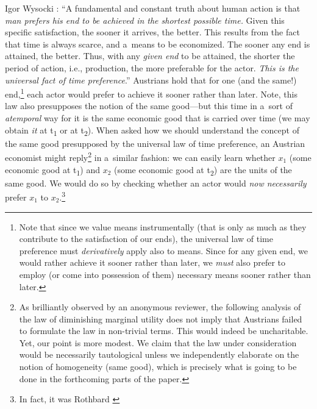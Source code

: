 \begin{artengenv}{Igor Wysocki}
{%
\parencite*[][p.15]{rothbard_toward_2011}: %
 ``A fundamental and constant truth about human action is that \textit{man prefers his end to be achieved in the shortest possible time.} Given this specific satisfaction, the sooner it arrives, the better. This results from the fact that time is always scarce, and a~means to be economized. The sooner any end is attained, the better. Thus, with any \textit{given end} to be attained, the shorter the period of action, i.e., production, the more preferable for the actor. \textit{This is the universal fact of time preference}.''} Austrians hold that for one (and the same!) end,\footnote{Note that since we value means instrumentally (that is only as much as they contribute to the satisfaction of our ends), the universal law of time preference must \textit{derivatively} apply also to means. Since for any given end, we would rather achieve it sooner rather than later, we \textit{must} also prefer to employ (or come into possession of them) necessary means sooner rather than later.} each actor would prefer to achieve it sooner rather than later. Note, this law also presupposes the notion of the same good---but this time in a~sort of \textit{atemporal} way for it is the same economic good that is carried over time (we may obtain \textit{it} at t\textsubscript{1} or at t\textsubscript{2}). When asked how we should understand the concept of the same good presupposed by the universal law of time preference, an Austrian economist might reply\footnote{As brilliantly observed by an anonymous reviewer, the following analysis of the law of diminishing marginal utility does not imply that Austrians failed to formulate the law in non-trivial terms. This would indeed be uncharitable. Yet, our point is more modest. We claim that the law under consideration would be necessarily tautological unless we independently elaborate on the notion of homogeneity (same good), which is precisely what is going to be done in the forthcoming parts of the paper.} in a~similar fashion: we can easily learn whether $x_{1}$ (some economic good at t\textsubscript{1}) and $x_{2}$ (some economic good at t\textsubscript{2}) are the units of the same good. We would do so by checking whether an actor would \textit{now necessarily} prefer $x_{1}$ to $x_{2}$.\footnote{In fact, it was Rothbard 
\parencite*[][pp.15–16]{rothbard_toward_2011} %
}
\end{artengenv}
